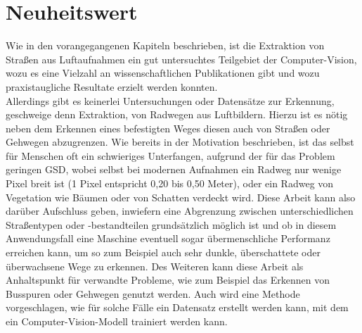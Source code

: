 \section{Neuheitswert}

Wie in den vorangegangenen Kapiteln beschrieben, ist die Extraktion von Straßen aus Luftaufnahmen 
ein gut untersuchtes Teilgebiet der Computer-Vision, wozu es eine Vielzahl an wissenschaftlichen Publikationen gibt
und wozu praxistaugliche Resultate erzielt werden konnten. \\
Allerdings gibt es keinerlei Untersuchungen oder Datensätze zur Erkennung, geschweige denn Extraktion, 
von Radwegen aus Luftbildern. Hierzu ist es nötig neben dem Erkennen eines befestigten Weges  
diesen auch von Straßen oder Gehwegen abzugrenzen. Wie bereits in der Motivation beschrieben, ist das selbst für 
Menschen oft ein schwieriges Unterfangen, aufgrund der für das Problem geringen \ac{GSD}, wobei selbst bei modernen 
Aufnahmen ein Radweg nur wenige Pixel breit ist (1 Pixel entspricht 0,20 bis 0,50 Meter), oder ein Radweg von Vegetation wie Bäumen oder von Schatten verdeckt wird.
Diese Arbeit kann also darüber Aufschluss geben, inwiefern eine Abgrenzung zwischen unterschiedlichen Straßentypen oder -bestandteilen 
grundsätzlich möglich ist und ob in diesem Anwendungsfall eine Maschine eventuell sogar übermenschliche Performanz 
erreichen kann, um so zum Beispiel auch sehr dunkle, überschattete oder überwachsene Wege zu erkennen. 
Des Weiteren kann diese Arbeit als Anhaltspunkt für verwandte Probleme, wie zum Beispiel das Erkennen von Busspuren 
oder Gehwegen genutzt werden. Auch wird eine Methode vorgeschlagen, wie für solche Fälle ein Datensatz erstellt werden 
kann, mit dem ein Computer-Vision-Modell trainiert werden kann. 


